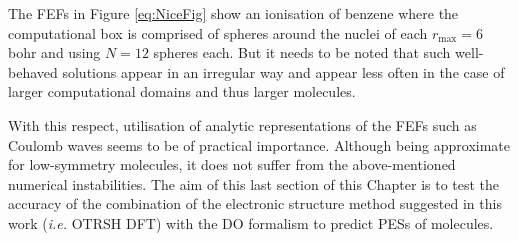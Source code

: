 The FEFs in Figure \ref{eq:NiceFig} show an ionisation of benzene where the computational box is comprised of spheres around the nuclei of each $r_\text{max}=6\,$bohr and using $N=12$ spheres each.
But it needs to be noted that such well-behaved solutions appear in an irregular way and appear less often in the case of larger computational domains and thus larger molecules.

With this respect, utilisation of analytic representations of the FEFs such as Coulomb waves seems to be of practical importance.
Although being approximate for low-symmetry molecules, it does not suffer from the above-mentioned numerical instabilities.
The aim of this last section of this Chapter is to test the accuracy of the combination of the electronic structure method suggested in this work (\textit{i.e.} OTRSH DFT) with the DO formalism to predict PESs of molecules.

